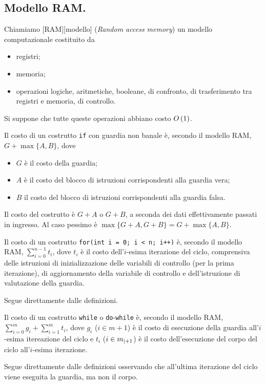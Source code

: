 \subsection{Modello RAM.}
\label{AlgoritmiEStruttureDiDati_ModelloRAM}
\begin{Definition}
	Chiamiamo [RAM][modello] (\textit{Random access memory}) un modello computazionale costituito da
	\begin{itemize}
		\item registri;
		\item memoria;
		\item operazioni logiche, aritmetiche, booleane, di confronto, di trasferimento tra registri e memoria, di controllo.
	\end{itemize}
	Si suppone che tutte queste operazioni abbiano costo $O \left ( 1 \right )$.
\end{Definition}
\begin{Theorem}
	Il costo di un costrutto \texttt{if} con guardia non banale \`e, secondo il modello RAM, $G + \max\lbrace A,B \rbrace$, dove
	\begin{itemize}
		\item $G$ \`e il costo della guardia;
		\item $A$ \`e il costo del blocco di istruzioni corrispondenti alla guardia vera;
		\item $B$ il costo del blocco di istruzioni corrispondenti alla guardia falsa.
	\end{itemize}
\end{Theorem}
\Proof Il costo del costrutto \`e $G + A$ o $G + B$, a seconda dei dati effettivamente passati in ingresso. Al caso pessimo \`e $\max \lbrace G + A, G + B \rbrace = G + \max \lbrace A, B \rbrace$. \EndProof
\begin{Theorem}
	Il costo di un costrutto \texttt{for(int i = 0; i < n; i++)} \`e, secondo il modello RAM, $\sum_{i = 0}^{n - 1} t_i$, dove $t_i$ \`e il costo dell'$i$-esima iterazione del ciclo, comprensiva delle istruzioni di inizializzazione delle variabili di controllo (per la prima iterazione), di aggiornamento della variabile di controllo e dell'istruzione di valutazione della guardia.
\end{Theorem}
\Proof Segue direttamente dalle definizioni. \EndProof
\begin{Theorem}
	Il costo di un costrutto \texttt{while} o \texttt{do}-\texttt{while} \`e, secondo il modello RAM, $\sum_{i = 0}^m g_i + \sum_{i = 1}^m t_i$, dove $g_i$ ($i \in m + 1$) \`e il costo di esecuzione della guardia all'$i$-esima itereazione del ciclo e $t_i$ ($i \in {m}_{|+ 1}$) \`e il costo dell'esecuzione del corpo del ciclo all'$i$-esima iterazione.
\end{Theorem}
\Proof Segue direttamente dalle definizioni osservando che all'ultima iterazione del ciclo viene eseguita la guardia, ma non il corpo. \EndProof
